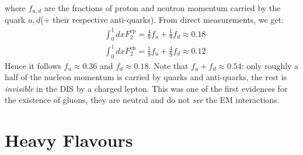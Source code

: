 \documentclass[10.75pt,a4paper,openright,bottom=2cm]{article}
\begin{document}
where $f_{u,d}$ are the fractions of proton and neutron momentum carried by the quark $u,d$(+ their respective anti-quarks). From direct measurements, we get:
\begin{align*}
&\int_0^1dxF_2^{\text{ep}}=\frac{4}{9}f_u+\frac{1}{9}f_d\approx0.18\\
&\int_0^1dxF_2^{\text{en}}=\frac{1}{9}f_u+\frac{4}{9}f_d\approx0.12
\end{align*}
Hence it follows $f_u\approx0.36$ and $f_d\approx0.18$. Note that $f_u+f_d\approx0.54$: only roughly a half of the nucleon momentum is carried by quarks and anti-quarks, the rest is \textit{invisible} in the DIS by a charged lepton. This was one of the first evidences for the existence of gluons, they are neutral and do not \textit{see} the EM interactions.
\newpage
\section{Heavy Flavours}
\end{document}

